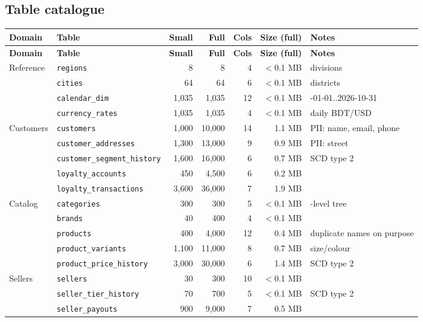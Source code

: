 \documentclass[11pt,a4paper]{article}
\newcommand{\code}[1]{\texttt{\small #1}}
\begin{document}
\subsection{Table catalogue}

{\footnotesize
\begin{longtable}{@{}l l r r r r >{\raggedright\arraybackslash}p{3.1cm}@{}}
\toprule
\textbf{Domain} & \textbf{Table} & \textbf{Small} & \textbf{Full} & \textbf{Cols} & \textbf{Size (full)} & \textbf{Notes}\\
\midrule
\endfirsthead
\toprule
\textbf{Domain} & \textbf{Table} & \textbf{Small} & \textbf{Full} & \textbf{Cols} & \textbf{Size (full)} & \textbf{Notes}\\
\midrule
\endhead
Reference & \code{regions} & 8 & 8 & 4 & $<$0.1 MB & 8 divisions\\
 & \code{cities} & 64 & 64 & 6 & $<$0.1 MB & 64 districts\\
 & \code{calendar\_dim} & 1,035 & 1,035 & 12 & $<$0.1 MB & 2024-01-01..2026-10-31\\
 & \code{currency\_rates} & 1,035 & 1,035 & 4 & $<$0.1 MB & daily BDT/USD\\
Customers & \code{customers} & 1,000 & 10,000 & 14 & 1.1 MB & PII: name, email, phone\\
 & \code{customer\_addresses} & 1,300 & 13,000 & 9 & 0.9 MB & PII: street\\
 & \code{customer\_segment\_history} & 1,600 & 16,000 & 6 & 0.7 MB & SCD type 2\\
 & \code{loyalty\_accounts} & 450 & 4,500 & 6 & 0.2 MB & \\
 & \code{loyalty\_transactions} & 3,600 & 36,000 & 7 & 1.9 MB & \\
Catalog & \code{categories} & 300 & 300 & 5 & $<$0.1 MB & 3-level tree\\
 & \code{brands} & 40 & 400 & 4 & $<$0.1 MB & \\
 & \code{products} & 400 & 4,000 & 12 & 0.4 MB & duplicate names on purpose\\
 & \code{product\_variants} & 1,100 & 11,000 & 8 & 0.7 MB & size/colour\\
 & \code{product\_price\_history} & 3,000 & 30,000 & 6 & 1.4 MB & SCD type 2\\
Sellers & \code{sellers} & 30 & 300 & 10 & $<$0.1 MB & \\
 & \code{seller\_tier\_history} & 70 & 700 & 5 & $<$0.1 MB & SCD type 2\\
 & \code{seller\_payouts} & 900 & 9,000 & 7 & 0.5 MB & \\

\end{longtable}}
\end{document}
